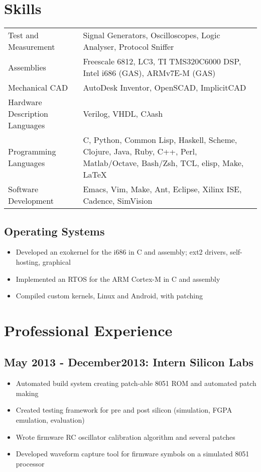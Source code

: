 \documentclass[letterpaper,12pt]{resume}
\begin{document}
\section{Skills}
\noindent
\begin{tabular}{p{}p{}}
  Test and Measurement&
  Signal Generators, Oscilloscopes, Logic Analyser, Protocol Sniffer\\
  \noalign{\smallskip}
  Assemblies&
  Freescale 6812, LC3, TI TMS320C6000 DSP, Intel i686 (GAS), ARMv7E-M (GAS)\\
  \noalign{\smallskip}
  Mechanical CAD&
  AutoDesk Inventor, OpenSCAD, ImplicitCAD\\
  \noalign{\smallskip}
  Hardware Description Languages&
  Verilog, VHDL, C$\lambda$ash\\
  \noalign{\smallskip}
  Programming Languages&
  C, Python, Common Lisp, Haskell, Scheme, Clojure, Java, Ruby, C++, Perl, Matlab/Octave, Bash/Zsh, TCL, elisp, Make, \LaTeX\ \\
  \noalign{\smallskip}
  Software Development&
  Emacs, Vim, Make, Ant, Eclipse, Xilinx ISE, Cadence, SimVision\\
\end{tabular}

\subsection{Operating Systems}
\begin{itemize}
  \item
    Developed an exokernel for the i686 in C and assembly; ext2 drivers, self-hosting, graphical
  \item
    Implemented an RTOS for the ARM Cortex-M in C and assembly
  \item
    Compiled custom kernels, Linux and Android, with patching
\end{itemize}

\section{Professional Experience}
\subsection{May 2013 - December2013: Intern Silicon Labs}
\begin{itemize}
  \item
    Automated build system creating patch-able 8051 ROM and automated patch making
  \item
    Created testing framework for pre and post silicon (simulation, FGPA emulation, evaluation)
  \item
    Wrote firmware RC oscillator calibration algorithm and several patches
  \item
    Developed waveform capture tool for firmware symbols on a simulated 8051 processor
\end{itemize}
\end{document}
